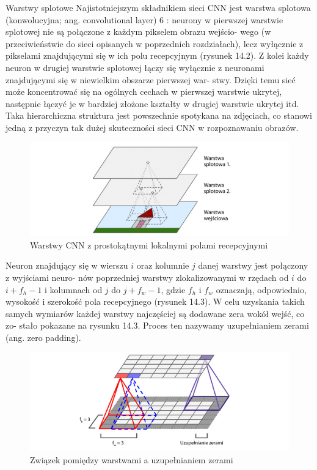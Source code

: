 \documentclass[12pt]{mwbk}
\theoremstyle{plain}
\theoremstyle{definition}
\theoremstyle{remark}
\newcommand\zrodlo[1]{\par\vspace{-3mm}{\small\textit{Źródło: }#1 }}
\begin{document}
Warstwy splotowe
Najistotniejszym składnikiem sieci CNN jest warstwa splotowa (konwolucyjna; ang. convolutional
layer) 6 : neurony w pierwszej warstwie splotowej nie są połączone z każdym pikselem obrazu wejścio-
wego (w przeciwieństwie do sieci opisanych w poprzednich rozdziałach), lecz wyłącznie z pikselami
znajdującymi się w ich polu recepcyjnym (rysunek 14.2). Z kolei każdy neuron w drugiej warstwie
splotowej łączy się wyłącznie z neuronami znajdującymi się w niewielkim obszarze pierwszej war-
stwy. Dzięki temu sieć może koncentrować się na ogólnych cechach w pierwszej warstwie ukrytej,
następnie łączyć je w bardziej złożone kształty w drugiej warstwie ukrytej itd. Taka hierarchiczna
struktura jest powszechnie spotykana na zdjęciach, co stanowi jedną z przyczyn tak dużej skuteczności
sieci CNN w rozpoznawaniu obrazów.
\begin{figure}[!h]
	\centering
	\includegraphics[width=\linewidth]{rys/warstwy_cnn.png}
	\caption{Warstwy CNN z prostokątnymi lokalnymi polami recepcyjnymi}
	\zrodlo{\cite{geron}}
	\label{fig:warstwy-cnn}
\end{figure}
Neuron znajdujący się w wierszu $i$ oraz kolumnie $j$ danej warstwy jest połączony z wyjściami neuro-
nów poprzedniej warstwy zlokalizowanymi w rzędach od $i$ do $i+f_h -1$ i kolumnach od $j$ do $j+f_w -1$,
gdzie $f_h$ i $f_w$ oznaczają, odpowiednio, wysokość i szerokość pola recepcyjnego (rysunek 14.3). W celu
uzyskania takich samych wymiarów każdej warstwy najczęściej są dodawane zera wokół wejść, co zo-
stało pokazane na rysunku 14.3. Proces ten nazywamy uzupełnianiem zerami (ang. zero padding).
\begin{figure}[!h]
	\centering
	\includegraphics[width=\linewidth]{rys/zero_padding.png}
	\caption{Związek pomiędzy warstwami a uzupełnianiem zerami}
	\zrodlo{\cite{geron}}
	\label{fig:zero-padding}
\end{figure}
\end{document}
